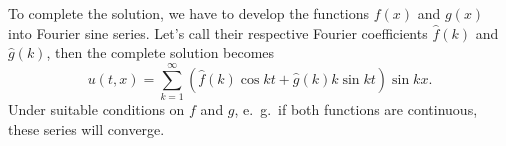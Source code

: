 To complete the solution, we have to develop the functions $f(x)$ and
$g(x)$ into Fourier sine series.
Let's call their respective Fourier coefficients
$\hat f(k)$ and $\hat g(k)$, then the complete solution becomes
\[
u(t,x)
=
\sum_{k=1}^{\infty}(\hat f(k)\cos kt+\hat g(k)k\sin kt)\sin kx.
\]
Under suitable conditions on $f$ and $g$, e.~g.~if both functions are
continuous, these series will converge.

